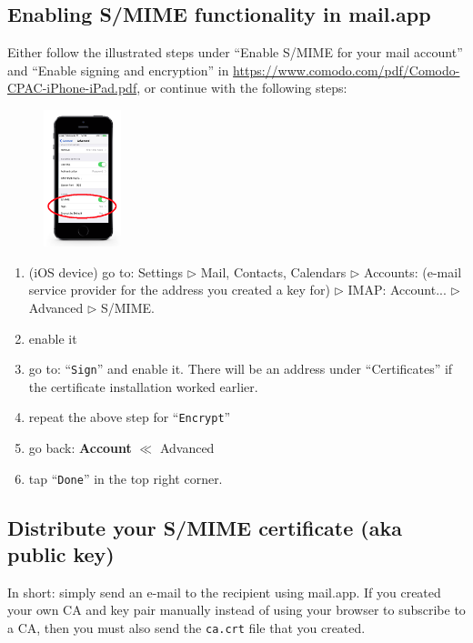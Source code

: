 \documentclass[pdftex,12pt,titlepage=false]{scrartcl}
\begin{document}
\subsection{Enabling S/MIME functionality in mail.app}\label{smime_enable}
Either follow the illustrated steps under ``Enable S/MIME for your
mail account'' and ``Enable signing and encryption'' in
\url{https://www.comodo.com/pdf/Comodo-CPAC-iPhone-iPad.pdf}, or
continue with the following steps:\\[-2em]%
\begin{figure}%
  \includegraphics[width=0.2\textwidth]{images/mailapp_smime_settings_indicated.png}
\end{figure}%
\begin{enumerate}%
\item (iOS device) go to: Settings $\triangleright$ Mail, Contacts,
  Calendars $\triangleright$ Accounts: (e-mail service provider for
  the address you created a key for) $\triangleright$ IMAP:
  Account... $\triangleright$ Advanced $\triangleright$ S/MIME.
\item enable it
\item go to: ``\verb|Sign|'' and enable it.  There will be an address under
  ``Certificates'' if the certificate installation worked earlier.
\item repeat the above step for ``\verb|Encrypt|''
\item go back: \textbf{Account} $\ll$ Advanced
\item tap ``\verb|Done|'' in the top right corner.
\end{enumerate}

\subsection{Distribute your S/MIME certificate (aka public key)}
In short: simply send an e-mail to the recipient using mail.app.  If
you created your own CA and key pair manually instead of using your
browser to subscribe to a CA, then you must also send the
\verb|ca.crt| file
that you created.\\
\end{document}
